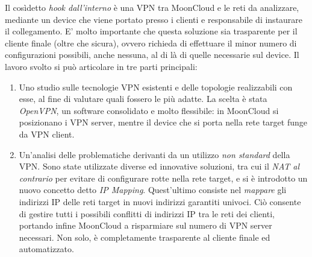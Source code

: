 \documentclass[10pt,a4paper]{article}
\begin{document}
        Il cosìdetto \textit{hook dall'interno} è una VPN tra
        MoonCloud e le reti da analizzare, mediante un device che viene portato presso i clienti
        e responsabile di instaurare il collegamento. E' molto importante che questa soluzione
        sia trasparente per il cliente finale (oltre che sicura), ovvero richieda di
        effettuare il minor numero di configurazioni possibili, anche nessuna, al di là
        di quelle necessarie sul device.
        Il lavoro svolto si può articolare in tre parti principali:
        \begin{enumerate}
            \item Uno studio sulle tecnologie VPN esistenti e delle topologie realizzabili
            con esse, al fine di valutare quali
            fossero le più adatte. La scelta è stata \textit{OpenVPN},
            un software consolidato e molto flessibile: in MoonCloud si posizionano
            i VPN server, mentre il device che si porta nella rete target funge da
            VPN client.
            \item Un'analisi delle problematiche derivanti da un utilizzo
            \textit{non standard} della VPN. Sono state utilizzate diverse ed
            innovative soluzioni, tra cui il \textit{NAT al contrario} per evitare
            di configurare rotte nella rete target, e si è introdotto un nuovo
            concetto detto \textit{IP Mapping}. Quest'ultimo consiste nel
            \textit{mappare} gli indirizzi IP delle reti target in nuovi
            indirizzi garantiti univoci. Ciò consente
            di gestire tutti i possibili conflitti di indirizzi IP tra le reti
            dei clienti, portando infine MoonCloud a risparmiare sul numero
            di VPN server necessari. Non solo, è completamente trasparente
            al cliente finale ed automatizzato.

\end{enumerate}
\end{document}
